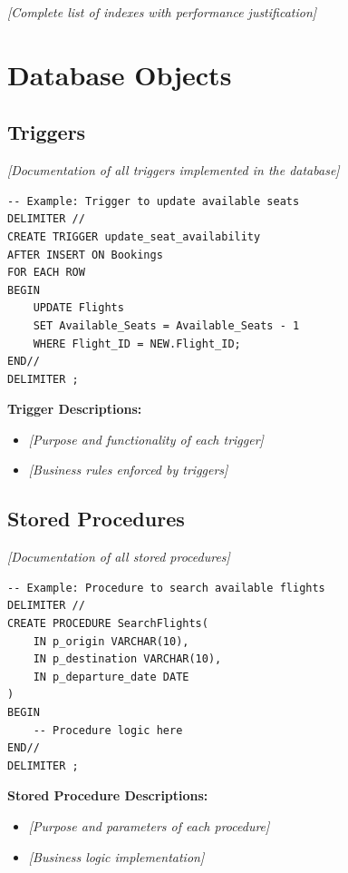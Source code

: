 \documentclass[12pt,a4paper,openany]{report}
\begin{document}
\textit{[Complete list of indexes with performance justification]}

\section{Database Objects}

\subsection{Triggers}

\textit{[Documentation of all triggers implemented in the database]}

\begin{lstlisting}[caption={Sample Trigger - Seat Availability}]
-- Example: Trigger to update available seats
DELIMITER //
CREATE TRIGGER update_seat_availability
AFTER INSERT ON Bookings
FOR EACH ROW
BEGIN
    UPDATE Flights
    SET Available_Seats = Available_Seats - 1
    WHERE Flight_ID = NEW.Flight_ID;
END//
DELIMITER ;
\end{lstlisting}

\textbf{Trigger Descriptions:}
\begin{itemize}
    \item \textit{[Purpose and functionality of each trigger]}
    \item \textit{[Business rules enforced by triggers]}
\end{itemize}

\subsection{Stored Procedures}

\textit{[Documentation of all stored procedures]}

\begin{lstlisting}[caption={Sample Stored Procedure - Flight Search}]
-- Example: Procedure to search available flights
DELIMITER //
CREATE PROCEDURE SearchFlights(
    IN p_origin VARCHAR(10),
    IN p_destination VARCHAR(10),
    IN p_departure_date DATE
)
BEGIN
    -- Procedure logic here
END//
DELIMITER ;
\end{lstlisting}

\textbf{Stored Procedure Descriptions:}
\begin{itemize}
    \item \textit{[Purpose and parameters of each procedure]}
    \item \textit{[Business logic implementation]}
\end{itemize}
\end{document}
